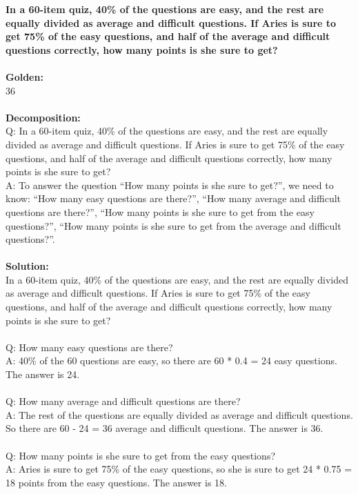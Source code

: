 \noindent
\textbf{In a 60-item quiz, 40\% of the questions are easy, and the rest are equally divided as average and difficult questions. If Aries is sure to get 75\% of the easy questions, and half of the average and difficult questions correctly, how many points is she sure to get?} \\
 \\
\textbf{Golden:} \\
36 \\
 \\
\textbf{Decomposition:} \\
Q: In a 60-item quiz, 40\% of the questions are easy, and the rest are equally divided as average and difficult questions. If Aries is sure to get 75\% of the easy questions, and half of the average and difficult questions correctly, how many points is she sure to get? \\
A: To answer the question ``How many points is she sure to get?'', we need to know: ``How many easy questions are there?'', ``How many average and difficult questions are there?'', ``How many points is she sure to get from the easy questions?'', ``How many points is she sure to get from the average and difficult questions?''. \\
 \\
\textbf{Solution:} \\
In a 60-item quiz, 40\% of the questions are easy, and the rest are equally divided as average and difficult questions. If Aries is sure to get 75\% of the easy questions, and half of the average and difficult questions correctly, how many points is she sure to get? \\
 \\
Q: How many easy questions are there? \\
A: 40\% of the 60 questions are easy, so there are 60 * 0.4 = 24 easy questions. The answer is 24. \\
 \\
Q: How many average and difficult questions are there? \\
A: The rest of the questions are equally divided as average and difficult questions. So there are 60 - 24 = 36 average and difficult questions. The answer is 36. \\
 \\
Q: How many points is she sure to get from the easy questions? \\
A: Aries is sure to get 75\% of the easy questions, so she is sure to get 24 * 0.75 = 18 points from the easy questions. The answer is 18. \\
